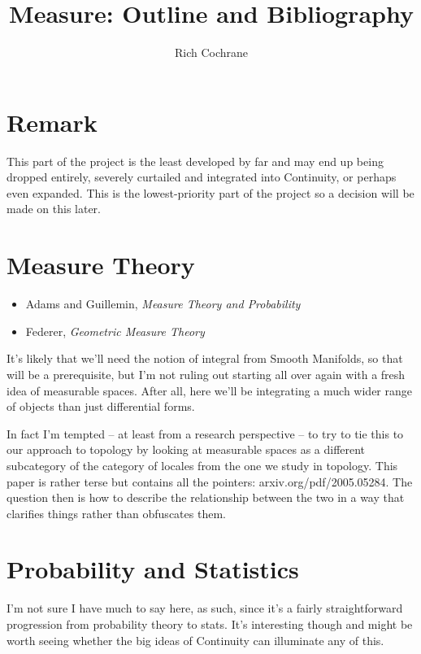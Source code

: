 \documentclass[article]{article}
\begin{document}
	
	\title{Measure: Outline and Bibliography}
	\author{Rich Cochrane}
	\maketitle
	
\section*{Remark}

This part of the project is the least developed by far and may end up being dropped entirely, severely curtailed and integrated into Continuity, or perhaps even expanded. This is the lowest-priority part of the project so a decision will be made on this later.


\section{Measure Theory}

\begin{itemize}
	\item{Adams and Guillemin, \textit{Measure Theory and Probability}}
	\item{Federer, \textit{Geometric Measure Theory}}
\end{itemize}

It's likely that we'll need the notion of integral from Smooth Manifolds, so that will be a prerequisite, but I'm not ruling out starting all over again with a fresh idea of measurable spaces. After all, here we'll be integrating a much wider range of objects than just differential forms.

In fact I'm tempted -- at least from a research perspective -- to try to tie this to our approach to topology by looking at measurable spaces as a different subcategory of the category of locales from the one we study in topology. This paper is rather terse but contains all the pointers: arxiv.org/pdf/2005.05284. The question then is how to describe the relationship between the two in a way that clarifies things rather than obfuscates them.

\section{Probability and Statistics}

I'm not sure I have much to say here, as such, since it's a fairly straightforward progression from probability theory to stats. It's interesting though and might be worth seeing whether the big ideas of Continuity can illuminate any of this.
\end{document}
